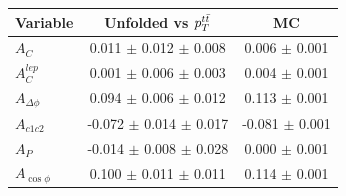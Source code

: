 \begin{table}[hbt]
\begin{center}
\begin{tabular}{l |  c  c }
\hline
Variable &  Unfolded vs $p_T^{t\bar{t}}$  &  MC \\ \hline
$A_{C}$                                 & 0.011 $\pm$ 0.012     $\pm$ 0.008      & 0.006 $\pm$  0.001 \\
$A^{lep}_{C}$                              & 0.001 $\pm$ 0.006     $\pm$ 0.003          & 0.004 $\pm$  0.001 \\
$A_{\Delta\phi}$                & 0.094 $\pm$ 0.006     $\pm$ 0.012          & 0.113 $\pm$  0.001 \\
$A_{c1c2}$                              & -0.072 $\pm$ 0.014 $\pm$ 0.017         & -0.081 $\pm$  0.001 \\
$A_{P}$                   & -0.014 $\pm$ 0.008 $\pm$ 0.028         & 0.000 $\pm$  0.001 \\
$A_{\cos\phi}$                              & 0.100 $\pm$ 0.011     $\pm$ 0.011          & 0.114 $\pm$  0.001 \\
 \hline
\end{tabular}
\end{center}
\end{table}

